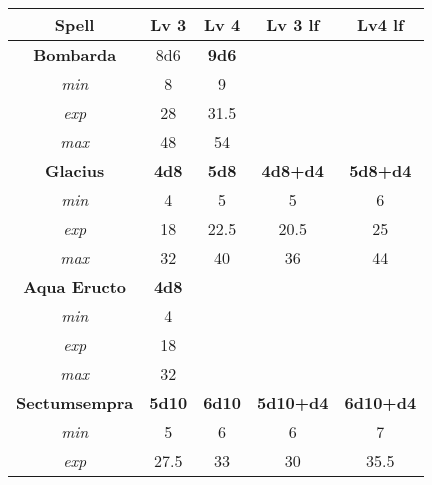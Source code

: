 \begin{tabular}{c|c|c|c|c}
	\textbf{Spell}         & \textbf{Lv 3}       & \textbf{Lv 4}         & \textbf{Lv 3 lf}  & \textbf{Lv4 lf}          \\ \hline
	\textbf{Bombarda}      &        8d6          & \textbf{9d6}          &                   &                          \\
	\textit{min}           &          8          &                 9     &                   &                          \\
	\textit{exp}           &         28          &                31.5   &                   &                          \\
	\textit{max}           &         48          &                54     &                   &                          \\ \hline
	\textbf{Glacius}       & \textbf{4d8}        & \textbf{5d8}          & \textbf{4d8+d4}   & \textbf{5d8+d4}          \\
	\textit{min}           &          4          &                 5     &           5       &                  6       \\
	\textit{exp}           &         18          &                22.5   &          20.5     &                 25       \\
	\textit{max}           &         32          &                40     &          36       &                 44       \\ \hline
	\textbf{Aqua Eructo}   & \textbf{4d8}        &                       &                   &                          \\
	\textit{min}           &          4          &                       &                   &                          \\
	\textit{exp}           &         18          &                       &                   &                          \\
	\textit{max}           &         32          &                       &                   &                          \\ \hline
	\textbf{Sectumsempra}  & \textbf{5d10}       & \textbf{6d10}         & \textbf{5d10+d4}  & \textbf{6d10+d4}         \\
	\textit{min}           &          5          &                 6     &            6      &                   7      \\
	\textit{exp}           &         27.5        &                33     &           30      &                  35.5    \\

\end{tabular}

